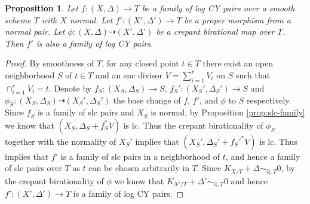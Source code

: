 \documentclass[reqno, 12pt]{amsart}
\newtheorem{prop}{Proposition}[section]
\theoremstyle{definition}
\newcommand{\bQ}{\mathbb{Q}}
\numberwithin{equation}{section}
\begin{document}
\begin{prop}\label{prop:cbir-CY-family}
Let $f:(X,\Delta) \to T$ be a family of log CY pairs over a smooth scheme $T$ with $X$ normal. Let $f':(X',\Delta')\to T$ be a proper morphism from a normal pair.  Let $\phi: (X,\Delta)\dashrightarrow (X',\Delta')$ be a crepant birational map over $T$. Then $f'$ is also a family of log CY pairs.
\end{prop}

\begin{proof}
    By smoothness of $T$, for any closed point $t\in T$ there exist an open neighborhood $S$ of $t\in T$ and an snc divisor $V=\sum_{i=1}^r V_i$ on $S$ such that $\cap_{i=1}^r V_i = t$. Denote by $f_S: (X_S,\Delta_S) \to S$, $f_S': (X_S',\Delta_S') \to S$ and $\phi_S: (X_S, \Delta_S) \dashrightarrow (X_S', \Delta_S')$ the base change of $f$, $f'$, and $\phi$ to $S$ respectively. Since $f_S$ is a family of slc pairs and $X_S$ is normal, by Proposition \ref{prop:slc-family} we know that $(X_S, \Delta_S + f_S^* V)$ is lc. Thus the crepant birationality of $\phi_S$ together with the normality of $X_S'$ implies that $(X_S', \Delta_S' + f_S'^* V)$ is lc. Thus \cite[Lemma 2.7]{BABWILD} implies that $f'$ is a family of slc pairs in a neighborhood of $t$, and hence a family of slc pairs over $T$ as $t$ can be chosen arbitrarily in $T$. Since $K_{X/T} + \Delta\sim_{\bQ, T} 0$, by the crepant birationality of $\phi$ we know that $K_{X'/T}+\Delta'\sim_{\bQ, T} 0$ and hence $f':(X',\Delta')\to T$ is a family of log CY pairs.  
\end{proof}
\end{document}
